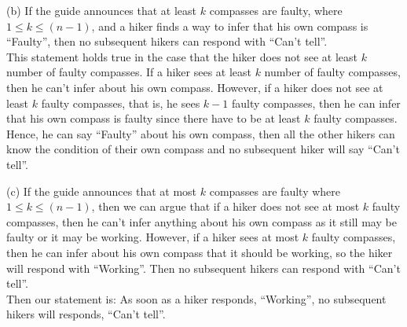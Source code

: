 \documentclass[a4paper]{exam}
\begin{document}
\begin{questions}
\begin{solution}
    (b) If the guide announces that at least $ k $ compasses are faulty, where $ 1 \leq k \leq (n - 1) $, and a hiker finds a way to infer that his own compass is ``Faulty'', then no subsequent hikers can respond with ``Can't tell''. \\ 
    This statement holds true in the case that the hiker does not see at least $k$ number of faulty compasses. If a hiker sees at least $k$ number of faulty compasses, then he can't infer about his own compass. However, if a hiker does not see at least $k$ faulty compasses, that is, he sees $ k - 1 $ faulty compasses, then he can infer that his own compass is faulty since there have to be at least $k$ faulty compasses. Hence, he can say ``Faulty'' about his own compass, then all the other hikers can know the condition of their own compass and no subsequent hiker will say ``Can't tell''.

    (c) If the guide announces that at most $k$ compasses are faulty where $ 1 \leq k \leq (n - 1) $, then we can argue that if a hiker does not see at most $k$ faulty compasses, then he can't infer anything about his own compass as it still may be faulty or it may be working. However, if a hiker sees at most $k$ faulty compasses, then he can infer about his own compass that it should be working, so the hiker will respond with ``Working''. Then no subsequent hikers can respond with ``Can't tell''. \\ 
    Then our statement is: As soon as a hiker responds, ``Working'', no subsequent hikers will responds, ``Can't tell''.
  \end{solution}
\end{questions}
\end{document}
